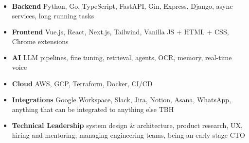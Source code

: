 {
    \begin{itemize}
        \item \textbf{Backend} Python, Go, TypeScript, FastAPI, Gin, Express, Django, async services, long running tasks
        \item \textbf{Frontend} Vue.js, React, Next.js, Tailwind, Vanilla JS + HTML + CSS, Chrome extensions
        \item \textbf{AI} LLM pipelines, fine tuning, retrieval, agents, OCR, memory, real-time voice
        \vspace{0.12cm}
        \item \textbf{Cloud} AWS, GCP, Terraform, Docker, CI/CD
        \item \textbf{Integrations} Google Workspace, Slack, Jira, Notion, Asana, WhatsApp, anything that can be integrated to anything else TBH
        \item \textbf{Technical Leadership} system design \& architecture, product research, UX, hiring and mentoring, managing engineering teams, being an early stage CTO
    \end{itemize}
}
